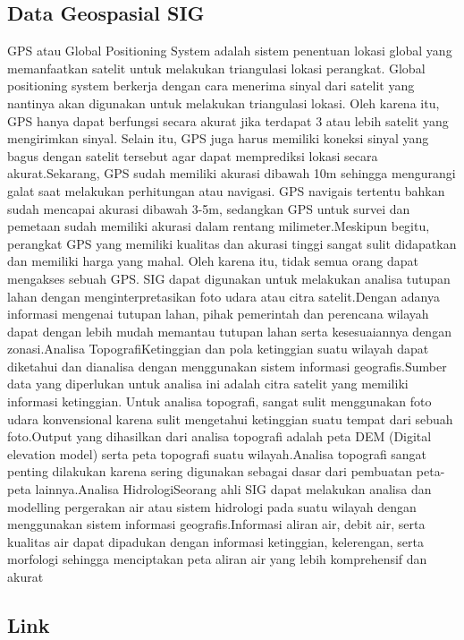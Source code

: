 \subsection{Data Geospasial SIG}
GPS atau Global Positioning System adalah sistem penentuan lokasi global yang memanfaatkan satelit untuk melakukan triangulasi lokasi perangkat.
Global positioning system berkerja dengan cara menerima sinyal dari satelit yang nantinya akan digunakan untuk melakukan triangulasi lokasi. Oleh karena itu, GPS hanya dapat berfungsi secara akurat jika terdapat 3 atau lebih satelit yang mengirimkan sinyal.
Selain itu, GPS juga harus memiliki koneksi sinyal yang bagus dengan satelit tersebut agar dapat memprediksi lokasi secara akurat.Sekarang, GPS sudah memiliki akurasi dibawah 10m sehingga mengurangi galat saat melakukan perhitungan atau navigasi. GPS navigais tertentu bahkan sudah mencapai akurasi dibawah 3-5m, sedangkan GPS untuk survei dan pemetaan sudah memiliki akurasi dalam rentang milimeter.Meskipun begitu, perangkat GPS yang memiliki kualitas dan akurasi tinggi sangat sulit didapatkan dan memiliki harga yang mahal. Oleh karena itu, tidak semua orang dapat mengakses sebuah GPS.
SIG dapat digunakan untuk melakukan analisa tutupan lahan dengan menginterpretasikan foto udara atau citra satelit.Dengan adanya informasi mengenai tutupan lahan, pihak pemerintah dan perencana wilayah dapat dengan lebih mudah memantau tutupan lahan serta kesesuaiannya dengan zonasi.Analisa TopografiKetinggian dan pola ketinggian suatu wilayah dapat diketahui dan dianalisa dengan menggunakan sistem informasi geografis.Sumber data yang diperlukan untuk analisa ini adalah citra satelit yang memiliki informasi ketinggian. Untuk analisa topografi, sangat sulit menggunakan foto udara konvensional karena sulit mengetahui ketinggian suatu tempat dari sebuah foto.Output yang dihasilkan dari analisa topografi adalah peta DEM (Digital elevation model) serta peta topografi suatu wilayah.Analisa topografi sangat penting dilakukan karena sering digunakan sebagai dasar dari pembuatan peta-peta lainnya.Analisa HidrologiSeorang ahli SIG dapat melakukan analisa dan modelling pergerakan air atau sistem hidrologi pada suatu wilayah dengan menggunakan sistem informasi geografis.Informasi aliran air, debit air, serta kualitas air dapat dipadukan dengan informasi ketinggian, kelerengan, serta morfologi sehingga menciptakan peta aliran air yang lebih komprehensif dan akurat

\subsection{Link}
\href{https://youtu.be/T2lvY-cI0IA}{}
